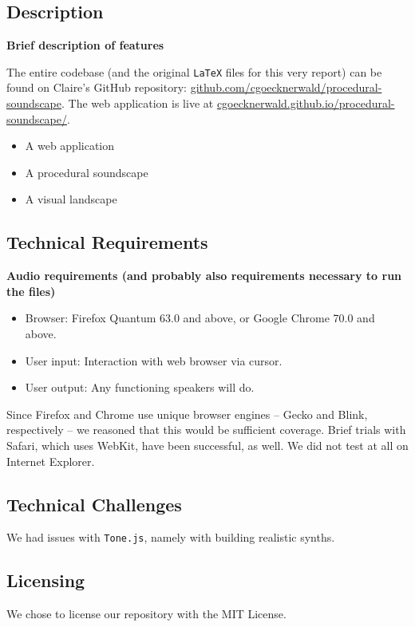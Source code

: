 \documentclass[12pt,a4paper]{article}
\newcommand{\code}{\texttt}
\newcommand{\lightcode}[1]{\colorbox{light-gray}{\texttt{#1}}}
\begin{document}
\subsection{Description}
\textbf{Brief description of features}

The entire codebase (and the original \code{LaTeX} files for this very report) can be found on Claire's GitHub repository: \href{https://github.com/cgoecknerwald/procedural-soundscape}{github.com/cgoecknerwald/procedural-soundscape}. The web application is live at \href{https://cgoecknerwald.github.io/procedural-soundscape/}{cgoecknerwald.github.io/procedural-soundscape/}.

\begin{itemize}
	\item A web application
	\item A procedural soundscape
	\item A visual landscape
\end{itemize}

\subsection{Technical Requirements}
\textbf{Audio requirements (and probably also requirements necessary to run the files)}

\begin{itemize}
	\item Browser: Firefox Quantum 63.0 and above, or Google Chrome 70.0 and above.
	\item User input: Interaction with web browser via cursor.
	\item User output: Any functioning speakers will do.
\end{itemize}

Since Firefox and Chrome use unique browser engines -- Gecko and Blink, respectively -- we reasoned that this would be sufficient coverage. Brief trials with Safari, which uses WebKit, have been successful, as well. We did not test at all on Internet Explorer.

\subsection{Technical Challenges}
We had issues with \lightcode{Tone.js}, namely with building realistic synths.

\subsection{Licensing}
We chose to license our repository with the MIT License.
\end{document}
